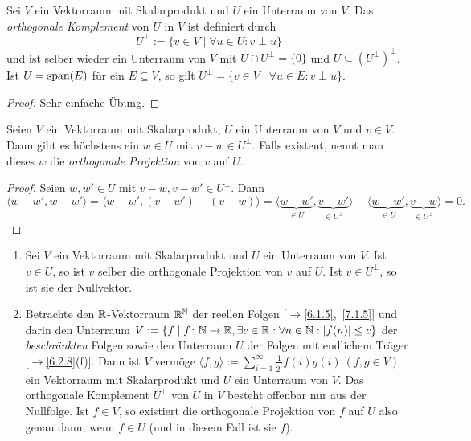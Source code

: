 \documentclass[../../main.tex]{subfiles}
\begin{document}
\begin{defprop}\label{11.2.9}
Sei $V$ ein Vektorraum mit Skalarprodukt und $U$ ein Unterraum von $V$. Das \emph{orthogonale Komplement} von $U$ in $V$ ist definiert durch
\[U^\perp:=\{v\in V\mid\forall u\in U:v\perp u\}\]
und ist selber wieder ein Unterraum von $V$ mit $U\cap U^\perp=\{0\}$ und $U\subseteq(U^\perp)^\perp$. Ist $U=\operatorname{span}(E)$ für ein $E\subseteq V$, so gilt
$U^\perp=\{v\in V\mid\forall u\in E:v\perp u\}$.
\end{defprop}

\begin{proof} Sehr einfache Übung.
\end{proof}

\begin{defprop}\label{11.2.10}
Seien $V$ ein Vektorraum mit Skalarprodukt, $U$ ein Unterraum von $V$ und $v\in V$. Dann gibt es höchstens ein $w\in U$ mit $v-w\in U^\perp$. Falls existent, nennt man dieses $w$ die \emph{orthogonale Projektion} von $v$ auf $U$.
\end{defprop}

\begin{proof}
Seien $w,w'\in U$ mit $v-w,v-w'\in U^\perp$. Dann
\[\langle w-w',w-w'\rangle=\langle w-w',(v-w')-(v-w)\rangle=
\langle\underbrace{w-w'}_{\in U},\underbrace{v-w'}_{\in U^\perp}\rangle-\langle\underbrace{w-w'}_{\in U},\underbrace{v-w}_{\in U^\perp}\rangle=0.\]
\end{proof}

\begin{bsp}\label{11.2.11}
\begin{enumerate}[\normalfont(a)]
\item
Sei $V$ ein Vektorraum mit Skalarprodukt und $U$ ein Unterraum von $V$. Ist $v\in U$, so ist $v$ selber die orthogonale Projektion von $v$ auf $U$. Ist
$v\in U^\perp$, so ist sie der Nullvektor.
\item
Betrachte den $\mathbb R$-Vektorraum $\mathbb R^\mathbb N$ der reellen Folgen [$\to$\ref{6.1.5},~\ref{7.1.5}] und darin den Unterraum $V:=\{f\mid f\colon\mathbb N\to\mathbb R,\exists c\in\mathbb R:\forall n\in\mathbb N:|f(n)|\le c\}$
der \emph{beschränkten} Folgen sowie den Unterraum $U$ der Folgen mit endlichem Träger [$\to$\ref{6.2.8}(f)]. Dann ist $V$ vermöge
$\langle f,g\rangle:=\sum_{i=1}^\infty\frac1{2^i}f(i)g(i)\ (f,g\in V)$ ein Vektorraum mit Skalarprodukt und $U$ ein Unterraum von $V$. Das orthogonale Komplement
$U^\perp$ von $U$ in $V$ besteht offenbar nur aus der Nullfolge. Ist $f\in V$, so existiert die orthogonale Projektion von $f$ auf $U$ also genau dann, wenn $f\in U$ (und in diesem Fall ist sie $f$).
\end{enumerate}
\end{bsp}
\end{document}
